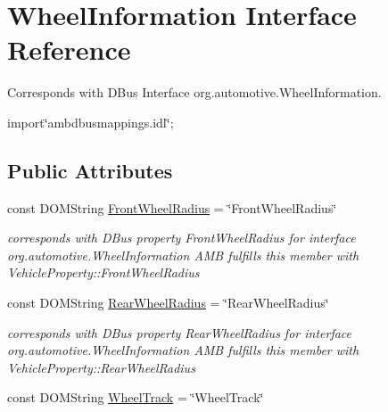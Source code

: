 \hypertarget{interfaceWheelInformation}{\section{Wheel\+Information Interface Reference}
\label{interfaceWheelInformation}
}


Corresponds with D\+Bus Interface org.\+automotive.\+Wheel\+Information.  




{\ttfamily import\char`\"{}ambdbusmappings.\+idl\char`\"{};}

\subsection*{Public Attributes}
\begin{DoxyCompactItemize}
\item 
\hypertarget{interfaceWheelInformation_abfaf420b0a747f043a8b933af1585a8f}{const D\+O\+M\+String \hyperlink{interfaceWheelInformation_abfaf420b0a747f043a8b933af1585a8f}{Front\+Wheel\+Radius} = \char`\"{}Front\+Wheel\+Radius\char`\"{}}\label{interfaceWheelInformation_abfaf420b0a747f043a8b933af1585a8f}

\begin{DoxyCompactList}\small\item\em corresponds with D\+Bus property Front\+Wheel\+Radius for interface org.\+automotive.\+Wheel\+Information A\+M\+B fulfills this member with Vehicle\+Property\+::\+Front\+Wheel\+Radius \end{DoxyCompactList}\item 
\hypertarget{interfaceWheelInformation_ab5d9a64c7336660a013e85738b2260c6}{const D\+O\+M\+String \hyperlink{interfaceWheelInformation_ab5d9a64c7336660a013e85738b2260c6}{Rear\+Wheel\+Radius} = \char`\"{}Rear\+Wheel\+Radius\char`\"{}}\label{interfaceWheelInformation_ab5d9a64c7336660a013e85738b2260c6}

\begin{DoxyCompactList}\small\item\em corresponds with D\+Bus property Rear\+Wheel\+Radius for interface org.\+automotive.\+Wheel\+Information A\+M\+B fulfills this member with Vehicle\+Property\+::\+Rear\+Wheel\+Radius \end{DoxyCompactList}\item 
\hypertarget{interfaceWheelInformation_a9b86b0884f24e3fa9d4f81b047dda024}{const D\+O\+M\+String \hyperlink{interfaceWheelInformation_a9b86b0884f24e3fa9d4f81b047dda024}{Wheel\+Track} = \char`\"{}Wheel\+Track\char`\"{}}\label{interfaceWheelInformation_a9b86b0884f24e3fa9d4f81b047dda024}


\end{DoxyCompactItemize}
